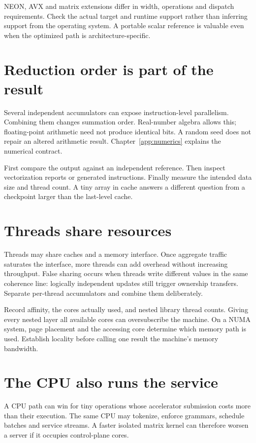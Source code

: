 NEON, AVX and matrix extensions differ in width, operations and dispatch
requirements. Check the actual target and runtime support rather than
inferring support from the operating system. A portable scalar reference
is valuable even when the optimized path is architecture-specific.

\section{Reduction order is part of the result}
Several independent accumulators can expose instruction-level parallelism.
Combining them changes summation order. Real-number algebra allows this;
floating-point arithmetic need not produce identical bits. A random seed
does not repair an altered arithmetic result. Chapter~\ref{app:numerics}
explains the numerical contract.

First compare the output against an independent reference. Then inspect
vectorization reports or generated instructions. Finally measure the
intended data size and thread count. A tiny array in cache answers a
different question from a checkpoint larger than the last-level cache.

\section{Threads share resources}
Threads may share caches and a memory interface. Once aggregate traffic
saturates the interface, more threads can add overhead without increasing
throughput. False sharing occurs when threads write different values in
the same coherence line: logically independent updates still trigger
ownership transfers. Separate per-thread accumulators and combine them
deliberately.

Record affinity, the cores actually used, and nested library thread counts.
Giving every nested layer all available cores can oversubscribe the
machine. On a NUMA system, page placement and the accessing core determine
which memory path is used. Establish locality before calling one result
the machine's memory bandwidth.

\section{The CPU also runs the service}
A CPU path can win for tiny operations whose accelerator submission costs
more than their execution. The same CPU may tokenize, enforce grammars,
schedule batches and service streams. A faster isolated matrix kernel can
therefore worsen a server if it occupies control-plane cores.

